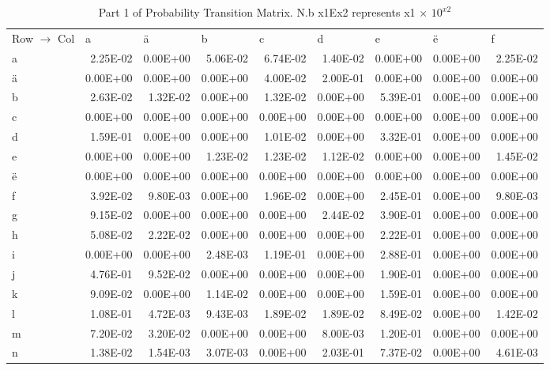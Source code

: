 \documentclass[11pt,a4paper]{CLabBookTemplate} %
\begin{document}
\begin{table}[htbp]
	\centering
	\caption{Part 1 of Probability Transition Matrix. N.b x1Ex2 represents x1 $\times$ $10^{x2}$}
	\begin{tabular}{lrrrrrrrr}
		Row $\rightarrow$ Col & \multicolumn{1}{l}{a} & \multicolumn{1}{l}{ä} & \multicolumn{1}{l}{b} & \multicolumn{1}{l}{c} & \multicolumn{1}{l}{d} & \multicolumn{1}{l}{e} & \multicolumn{1}{l}{ë} & \multicolumn{1}{l}{f} \\
		a     & 2.25E-02 & 0.00E+00 & 5.06E-02 & 6.74E-02 & 1.40E-02 & 0.00E+00 & 0.00E+00 & 2.25E-02 \\
		ä     & 0.00E+00 & 0.00E+00 & 0.00E+00 & 4.00E-02 & 2.00E-01 & 0.00E+00 & 0.00E+00 & 0.00E+00 \\
		b     & 2.63E-02 & 1.32E-02 & 0.00E+00 & 1.32E-02 & 0.00E+00 & 5.39E-01 & 0.00E+00 & 0.00E+00 \\
		c     & 0.00E+00 & 0.00E+00 & 0.00E+00 & 0.00E+00 & 0.00E+00 & 0.00E+00 & 0.00E+00 & 0.00E+00 \\
		d     & 1.59E-01 & 0.00E+00 & 0.00E+00 & 1.01E-02 & 0.00E+00 & 3.32E-01 & 0.00E+00 & 0.00E+00 \\
		e     & 0.00E+00 & 0.00E+00 & 1.23E-02 & 1.23E-02 & 1.12E-02 & 0.00E+00 & 0.00E+00 & 1.45E-02 \\
		ë     & 0.00E+00 & 0.00E+00 & 0.00E+00 & 0.00E+00 & 0.00E+00 & 0.00E+00 & 0.00E+00 & 0.00E+00 \\
		f     & 3.92E-02 & 9.80E-03 & 0.00E+00 & 1.96E-02 & 0.00E+00 & 2.45E-01 & 0.00E+00 & 9.80E-03 \\
		g     & 9.15E-02 & 0.00E+00 & 0.00E+00 & 0.00E+00 & 2.44E-02 & 3.90E-01 & 0.00E+00 & 0.00E+00 \\
		h     & 5.08E-02 & 2.22E-02 & 0.00E+00 & 0.00E+00 & 0.00E+00 & 2.22E-01 & 0.00E+00 & 0.00E+00 \\
		i     & 0.00E+00 & 0.00E+00 & 2.48E-03 & 1.19E-01 & 0.00E+00 & 2.88E-01 & 0.00E+00 & 0.00E+00 \\
		j     & 4.76E-01 & 9.52E-02 & 0.00E+00 & 0.00E+00 & 0.00E+00 & 1.90E-01 & 0.00E+00 & 0.00E+00 \\
		k     & 9.09E-02 & 0.00E+00 & 1.14E-02 & 0.00E+00 & 0.00E+00 & 1.59E-01 & 0.00E+00 & 0.00E+00 \\
		l     & 1.08E-01 & 4.72E-03 & 9.43E-03 & 1.89E-02 & 1.89E-02 & 8.49E-02 & 0.00E+00 & 1.42E-02 \\
		m     & 7.20E-02 & 3.20E-02 & 0.00E+00 & 0.00E+00 & 8.00E-03 & 1.20E-01 & 0.00E+00 & 0.00E+00 \\
		n     & 1.38E-02 & 1.54E-03 & 3.07E-03 & 0.00E+00 & 2.03E-01 & 7.37E-02 & 0.00E+00 & 4.61E-03 \\

\end{tabular}
\end{table}
\end{document}

